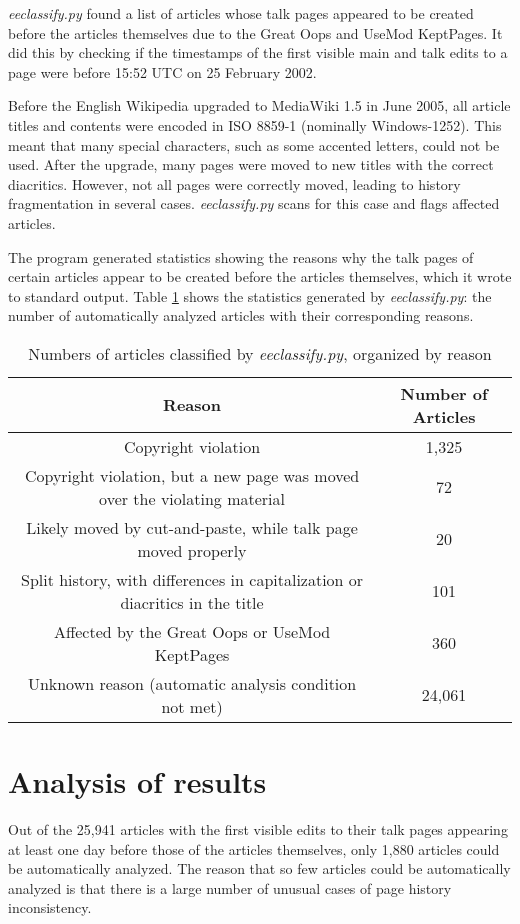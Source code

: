\documentclass[14pt,a4paper]{report}
\begin{document}
\textit{eeclassify.py} found a list of articles whose talk pages appeared to be created before the articles themselves due to the Great Oops and UseMod KeptPages. It did this by checking if the timestamps of the first visible main and talk edits to a page were before 15:52 UTC on 25 February 2002.

Before the English Wikipedia upgraded to MediaWiki 1.5 in June 2005, all article titles and contents were encoded in ISO 8859-1 (nominally Windows-1252). This meant that many special characters, such as some accented letters, could not be used. \autocite{utf8} After the upgrade, many pages were moved to new titles with the correct diacritics. However, not all pages were correctly moved, leading to history fragmentation in several cases. \textit{eeclassify.py} scans for this case and flags affected articles.

The program generated statistics showing the reasons why the talk pages of certain articles appear to be created before the articles themselves, which it wrote to standard output. Table \ref{tab:eeclassify} shows the statistics generated by \textit{eeclassify.py}: the number of automatically analyzed articles with their corresponding reasons.
\begin{table}[h!]
  \centering
  \caption{Numbers of articles classified by \textit{eeclassify.py}, organized by reason}
  \label{tab:eeclassify}
  \begin{tabular}{cc}
    \toprule
    Reason&Number of Articles\\
    \midrule
Copyright violation&1,325\\
Copyright violation, but a new page was moved over the violating material&72\\
Likely moved by cut-and-paste, while talk page moved properly&20\\
Split history, with differences in capitalization or diacritics in the title&101\\
Affected by the Great Oops or UseMod KeptPages&360\\
Unknown reason (automatic analysis condition not met) &24,061\\
    \bottomrule
  \end{tabular}
\end{table}

\chapter{Analysis of results}
Out of the 25,941 articles with the first visible edits to their talk pages appearing at least one day before those of the articles themselves, only 1,880 articles could be automatically analyzed. The reason that so few articles could be automatically analyzed is that there is a large number of unusual cases of page history inconsistency.
\end{document}
